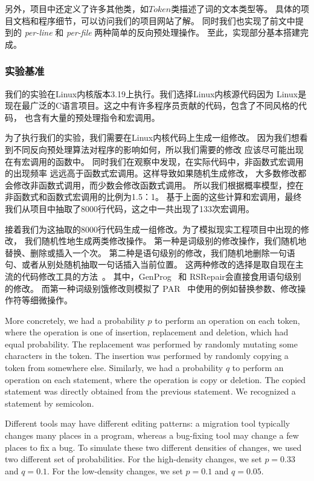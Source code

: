 另外，项目中还定义了许多其他类，如$Token$类描述了词的文本类型等。
具体的项目文档和程序细节，可以访问我们的项目网站了解。
同时我们也实现了前文中提到的 \emph{per-line} 和 \emph{per-file}
两种简单的反向预处理操作。
至此，实现部分基本搭建完成。


\subsubsection{实验基准}
我们的实验在Linux内核版本3.19上执行。我们选择Linux内核源代码因为
Linux是现在最广泛的C语言项目。这之中有许多程序员贡献的代码，包含了不同风格的代码，
也含有大量的预处理指令和宏调用。

为了执行我们的实验，我们需要在Linux内核代码上生成一组修改。
因为我们想看到不同反向预处理算法对程序的影响如何，所以我们需要的修改
应该尽可能出现在有宏调用的函数中。
同时我们在观察中发现，在实际代码中，非函数式宏调用的出现频率
远远高于函数式宏调用。这样导致如果随机生成修改，
大多数修改都会修改非函数式调用，而少数会修改函数式调用。
所以我们根据概率模型，控在非函数式和函数式宏调用的比例为1.5：1。
基于上面的这些计算和宏调用，最终我们从项目中抽取了8000行代码，这之中一共出现了133次宏调用。

接着我们为这抽取的8000行代码生成一组修改。为了模拟现实工程项目中出现的修改，
我们随机性地生成两类修改操作。
第一种是词级别的修改操作，我们随机地替换、删除或插入一个次。
第二种是语句级别的修改，我们随机地删除一句语句、或者从别处随机抽取一句话插入当前位置。
这两种修改的选择是取自现在主流的代码修改工具的方法~\parencite{le2012genprog,QiMLDW14,kim2013automatic}。
其中，GenProg~\parencite{le2012genprog} 和
RSRepair\parencite{QiMLDW14}会直接食用语句级别的修改。
而第一种词级别饿修改则模拟了 PAR~\parencite{kim2013automatic}
中使用的例如替换参数、修改操作符等细微操作。

More concretely, we had a probability $p$ to perform an operation on
each token, where the operation is one of insertion, replacement and
deletion, which had equal probability. The replacement was performed
by randomly mutating some characters in the token. The insertion was
performed by randomly copying a token from somewhere else. Similarly,
we had a probability $q$ to perform an operation on each statement,
where the operation is copy or deletion. The copied statement was
directly obtained from the previous statement. We recognized a
statement by semicolon.

Different tools may have different editing patterns:
a migration tool typically changes many places in a program, whereas a
bug-fixing tool may change a few places to fix a bug. To simulate these two different
densities of changes, we used two different set of probabilities. For
the high-density changes, we set $p=0.33$ and $q=0.1$. For
the low-density changes, we set $p=0.1$ and $q=0.05$.


